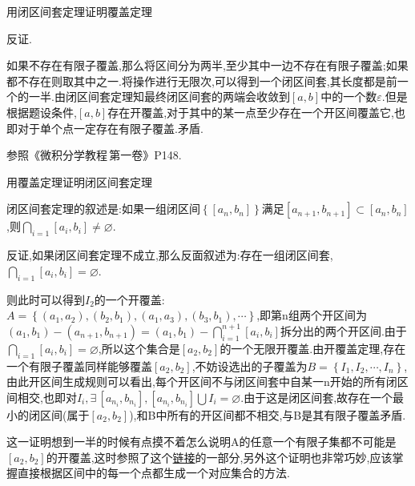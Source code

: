 \documentclass[cn,chinese,founder]{elegantbook}
\begin{document}
      \begin{exercise}
          用闭区间套定理证明覆盖定理
      \end{exercise}
      \begin{solution}
          反证.

          如果不存在有限子覆盖,那么将区间分为两半,至少其中一边不存在有限子覆盖;如果都不存在则取其中之一.将操作进行无限次,可以得到一个闭区间套,其长度都是前一个的一半.由闭区间套定理知最终闭区间套的两端会收敛到$\left[ a,b \right]$中的一个数$\varepsilon$.但是根据题设条件,$\left[ a,b \right]$存在开覆盖,对于其中的某一点至少存在一个开区间覆盖它,也即对于单个点一定存在有限子覆盖.矛盾.
      \end{solution}
      \begin{note}
          参照《微积分学教程\,第一卷》P148.
      \end{note}

      \begin{exercise}
          用覆盖定理证明闭区间套定理
      \end{exercise}
      \begin{solution}
          闭区间套定理的叙述是:如果一组闭区间$\left\{ \left[a_n,b_n\right] \right\}$满足$\left[a_{n+1},b_{n+1}\right]\subset \left[a_n,b_n\right]$,则$\bigcap_{i=1}\left[a_i,b_i\right]\neq \varnothing $.

          反证,如果闭区间套定理不成立,那么反面叙述为:存在一组闭区间套,$\bigcap_{i=1}\left[a_i,b_i\right]= \varnothing $.

          则此时可以得到$I_2$的一个开覆盖:$A=\left\{\left(a_1,a_2\right),\left(b_2,b_1\right),\left(a_1,a_3\right),\left(b_3,b_1\right),\cdots\right\}$,即第n组两个开区间为$\left(a_1,b_1\right)-\left(a_{n+1},b_{n+1}\right)=\left(a_1,b_1\right)-\bigcap_{i=1}^{n+1}\left[a_i,b_i\right]$拆分出的两个开区间.由于$\bigcap_{i=1}\left[a_i,b_i\right]= \varnothing $,所以这个集合是$\left[a_2,b_2\right]$的一个无限开覆盖.由开覆盖定理,存在一个有限子覆盖同样能够覆盖$\left[a_2,b_2\right]$,不妨设选出的子覆盖为$B=\left\{I_1,I_2,\cdots,I_n\right\}$,由此开区间生成规则可以看出,每个开区间不与闭区间套中自某一n开始的所有闭区间相交,也即对$I_i,\exists\, \left[a_{n_i},b_{n_i}\right],\left[a_{n_i},b_{n_i}\right]\textstyle\bigcup I_i=\varnothing$.由于这是闭区间套,故存在一个最小的闭区间(属于$\left[a_2,b_2\right]$),和B中所有的开区间都不相交,与B是其有限子覆盖矛盾.
      \end{solution}
      \begin{note}
          这一证明想到一半的时候有点摸不着怎么说明A的任意一个有限子集都不可能是$[a_2,b_2]$的开覆盖,这时参照了这个\href{https://blog.csdn.net/qq_45481282/article/details/107568842}{链接}的一部分,另外这个证明也非常巧妙,应该掌握直接根据区间中的每一个点都生成一个对应集合的方法.
      \end{note}
\end{document}
